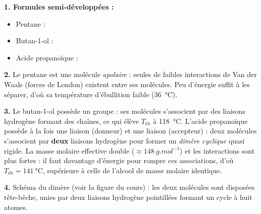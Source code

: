 \documentclass[11pt]{article}
\begin{document}
\begin{corrige}
\textbf{1. Formules semi-développées :}
\begin{itemize}
\item Pentane : 
\item Butan-1-ol : 
\item Acide propanoïque : 
\end{itemize}

\textbf{2.} Le pentane est une molécule \emph{apolaire} : seules de faibles interactions de Van der Waals (forces de London) existent entre ses molécules. Peu d'énergie suffit à les séparer, d'où sa température d'ébullition faible (\SI{36}{\celsius}).

\textbf{3.} Le butan-1-ol possède un groupe  : ses molécules s'associent par des liaisons hydrogène  formant des chaînes, ce qui élève $T_{\text{éb}}$ à \SI{118}{\celsius}. L'acide propanoïque possède à la fois une liaison  (donneur) et une liaison  (accepteur) : deux molécules s'associent par \textbf{deux} liaisons hydrogène pour former un \emph{dimère cyclique} quasi rigide. La masse molaire effective double ($\approx \SI{148}{g.mol^{-1}}$) et les interactions sont plus fortes : il faut davantage d'énergie pour rompre ces associations, d'où $T_{\text{éb}} = \SI{141}{\celsius}$, supérieure à celle de l'alcool de masse molaire identique.

\textbf{4.} Schéma du dimère (voir la figure du cours) : les deux molécules  sont disposées tête-bêche, unies par deux liaisons hydrogène pointillées  formant un cycle à huit atomes.
\end{corrige}
\end{document}
